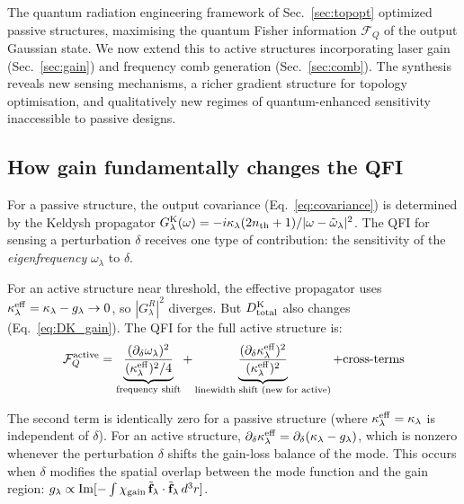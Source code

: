 \documentclass[12pt]{article}
\newcommand{\Keldysh}{{\rm K}}
\newcommand{\tf}{\tilde{\mathbf{f}}}
\newcommand{\tomega}{\tilde{\omega}}
\begin{document}
The quantum radiation engineering framework of Sec.~\ref{sec:topopt}
optimized passive structures, maximising the quantum Fisher information
$\mathcal{F}_Q$ of the output Gaussian state.  We now extend this to
active structures incorporating laser gain (Sec.~\ref{sec:gain}) and
frequency comb generation (Sec.~\ref{sec:comb}).  The synthesis reveals
new sensing mechanisms, a richer gradient structure for topology
optimisation, and qualitatively new regimes of quantum-enhanced sensitivity
inaccessible to passive designs.

\subsection{How gain fundamentally changes the QFI}
\label{sec:active_QFI}

For a passive structure, the output covariance (Eq.~\ref{eq:covariance})
is determined by the Keldysh propagator
$G^\Keldysh_\lambda(\omega) = -i\kappa_\lambda(2n_{\rm th}+1)/
|\omega-\tomega_\lambda|^2$.  The QFI for sensing a perturbation
$\delta$ receives one type of contribution: the sensitivity of the
\emph{eigenfrequency} $\omega_\lambda$ to $\delta$.

For an active structure near threshold, the effective propagator uses
$\kappa_\lambda^{\rm eff} = \kappa_\lambda - g_\lambda\to 0$, so
$|G^R_\lambda|^2$ diverges.  But $D^\Keldysh_{\rm total}$ also changes
(Eq.~\ref{eq:DK_gain}).  The QFI for the full active structure is:
\begin{equation}
  \mathcal{F}_Q^{\rm active} =
  \underbrace{\frac{(\partial_\delta\omega_\lambda)^2}
  {(\kappa_\lambda^{\rm eff})^2/4}}_{\text{frequency shift}}
  +\underbrace{\frac{(\partial_\delta\kappa_\lambda^{\rm eff})^2}
  {(\kappa_\lambda^{\rm eff})^2}}_{\text{linewidth shift (new for active)}}
  + \text{cross-terms}
  \label{eq:active_QFI}
\end{equation}

The second term is identically zero for a passive structure
(where $\kappa_\lambda^{\rm eff} = \kappa_\lambda$ is independent of
$\delta$).  For an active structure, $\partial_\delta\kappa_\lambda^{\rm eff}
= \partial_\delta(\kappa_\lambda - g_\lambda)$, which is nonzero whenever
the perturbation $\delta$ shifts the gain-loss balance of the mode.
This occurs when $\delta$ modifies the spatial overlap between the mode
function and the gain region: $g_\lambda\propto\mathrm{Im}[-\int\chi_{\rm gain}
\,\tf_\lambda\cdot\tf_\lambda\,d^3r]$.
\end{document}
